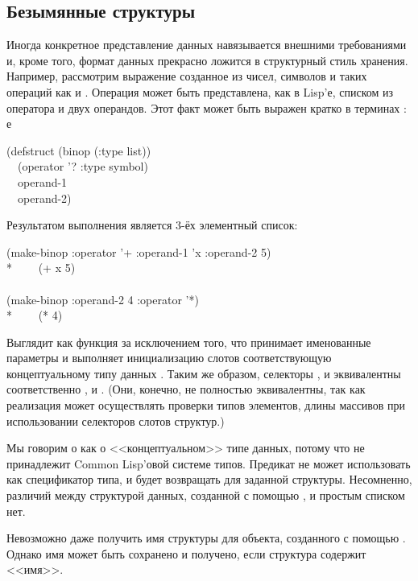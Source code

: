 \subsection{Безымянные структуры}

Иногда конкретное представление данных навязывается внешними требованиями и,
кроме того, формат данных прекрасно ложится в структурный стиль хранения.
Например, рассмотрим выражение созданное из чисел, символов и таких операций как
\cdf{+} и \cdf{*}. Операция может быть представлена, как в Lisp'е, списком из
оператора и двух операндов. Этот факт может быть выражен кратко в терминах
:
е\begin{lisp}
(defstruct (binop (:type list)) \\
~~(operator '? :type symbol) \\
~~operand-1 \\
~~operand-2)
\end{lisp}

Результатом выполнения  является 3-ёх элементный список:
\begin{lisp}
(make-binop :operator '+ :operand-1 'x :operand-2 5) \\*
~~~\EV\ (+ x 5) \\
\\
(make-binop :operand-2 4 :operator '*) \\*
~~~\EV\ (* {\nil} 4)
\end{lisp}
Выглядит как функция  за исключением того, что принимает именованные
параметры и выполняет инициализацию слотов соответствующую концептуальному типу
данных .
Таким же образом, селекторы ,  и
 эквивалентны соответственно ,  и
. (Они, конечно, не полностью эквивалентны, так как реализация
может осуществлять проверки типов элементов, длины массивов при использовании
селекторов слотов структур.)

Мы говорим о  как о <<концептуальном>> типе данных, потому что
 не принадлежит Common Lisp'овой системе типов. Предикат 
не может использовать  как спецификатор типа, и  будет
возвращать  для заданной  структуры. Несомненно, различий
между структурой данных, созданной с помощью , и  простым
списком нет.

Невозможно даже получить имя структуры для объекта, созданного с помощью
. Однако имя может быть сохранено и получено, если структура
содержит <<имя>>.

